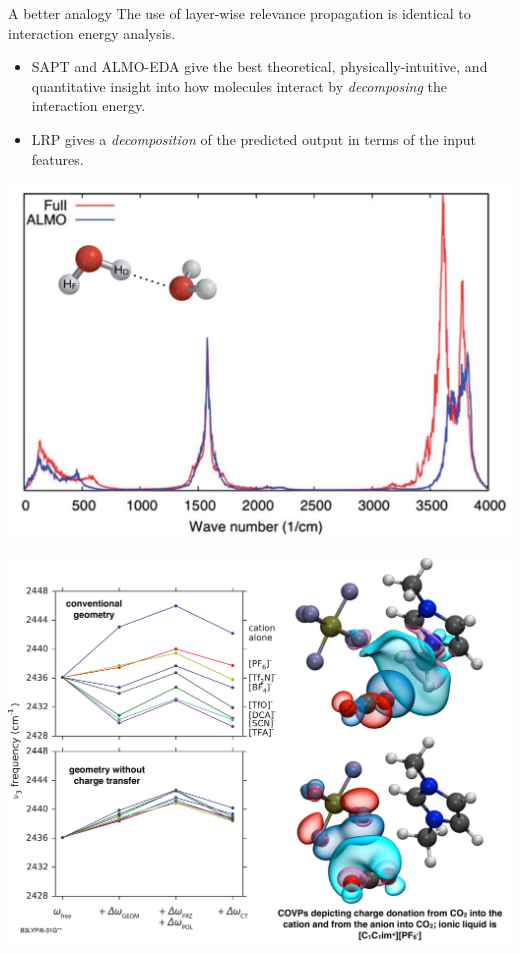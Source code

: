 \documentclass[compress]{beamer}
\begin{document}

\begin{frame}{A better analogy}
  The use of layer-wise relevance propagation is identical to interaction energy analysis.
  \begin{itemize}
  \item SAPT and ALMO-EDA give the best theoretical, physically-intuitive, and quantitative insight into how molecules interact by \emph{decomposing} the interaction energy.
  \item LRP gives a \emph{decomposition} of the predicted output in terms of the input features.
  \end{itemize}
\end{frame}

\begin{frame}{}
  \begin{center}
    \includegraphics[scale=0.50]{./figures/almo_water_combined.pdf}
  \end{center}
\end{frame}

\begin{frame}{}
  \begin{center}
    \includegraphics[scale=0.30]{./figures/slide_ionic_liquid.pdf}
  \end{center}
\end{frame}
\end{document}
